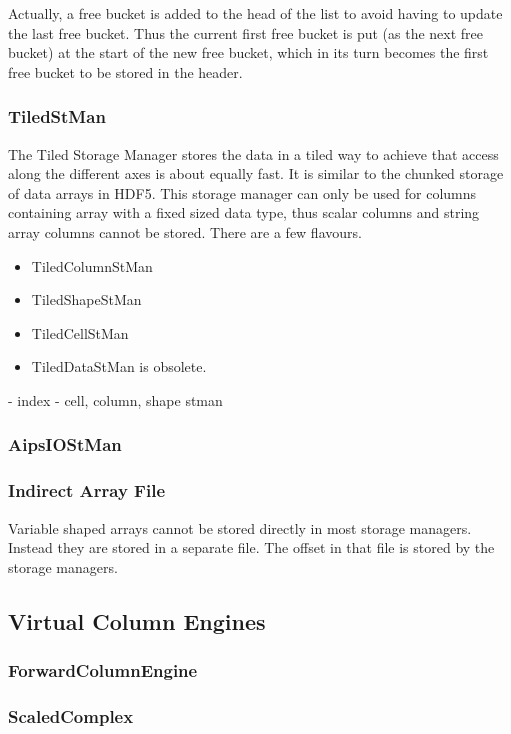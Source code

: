 \begin{itemize}
\begin{itemize}
Actually, a free bucket is added to the head of the list to avoid having to update
  the last free bucket. Thus the current first free bucket is put (as
  the next free bucket) at
  the start of the new free bucket, which in its turn becomes the
  first free bucket to be stored in the header.


\subsubsection{TiledStMan}
The Tiled Storage Manager stores the data in a tiled way
to achieve that access along the different axes is about equally fast.
It is similar to the chunked storage of data arrays 
in HDF5.
This storage manager can only be used for columns containing array
with a fixed sized data type, thus scalar columns and string array
columns cannot be stored.
There are a few flavours.
\begin{itemize}
\item TiledColumnStMan 
\item TiledShapeStMan 
\item TiledCellStMan 
\item TiledDataStMan is obsolete.
\end{itemize}

- index
- cell, column, shape stman


\subsubsection {AipsIOStMan}

\subsubsection{\label{CTDS:ARRAYFILE}Indirect Array File}
Variable shaped arrays cannot be stored directly in most storage
managers. Instead they are stored in a separate file. The offset in
that file is stored by the storage managers.




\subsection{Virtual Column Engines}

\subsubsection{ForwardColumnEngine}

\subsubsection{ScaledComplex}


\end{itemize}
\end{itemize}
